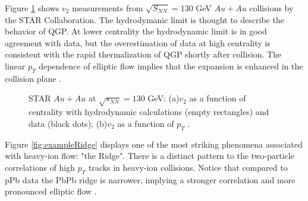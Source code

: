 Figure \ref{fig:exampleStarKine} shows $v_2$ measurements from $\sqrt{S_{NN}}=130$ GeV $Au+Au$ collisions by the STAR Collaboration. The hydrodymanic limit is thought to describe the behavior of QGP. At lower centrality the hydrodynamic limit is in good agreement with data, but the overestimation of data at high centrality is consistent with the rapid thermalization of QGP shortly after collision. The linear $p_T$ dependence of elliptic flow implies that the expansion is enhanced in the collision plane \cite{Ackermann:2000tr}. 

\begin{figure}%
    \centering
    \qquad
    \caption{STAR $Au+Au$ at $\sqrt{s_{NN}}=130$ GeV: (a)$v_2$ as a function of centrality with hydrodynamic calculations (empty rectangles) and data (black dots); (b)$v_2$ as a function of $p_T$ \cite{Ackermann:2000tr}.}%
    \label{fig:exampleStarKine}%
\end{figure}

Figure \ref{fig:exampleRidge} displays one of the most striking phenomena associated with heavy-ion flow: "the Ridge". There is a distinct pattern to the two-particle correlations of high $p_T$ tracks in heavy-ion collisions. Notice that compared to pPb data the PbPb ridge is narrower, implying a stronger correlation and more pronounced elliptic flow \cite{Chatrchyan:2013nka}. 

